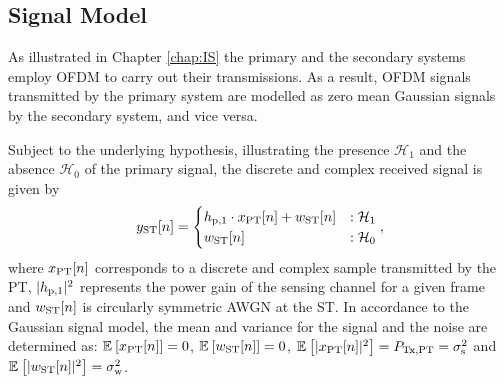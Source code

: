 

\subsection{Signal Model}
As illustrated in Chapter \ref{chap:IS} the primary and the secondary systems employ OFDM to carry out their transmissions. As a result, OFDM signals transmitted by the primary system are modelled as zero mean Gaussian signals by the secondary system, and vice versa. 

Subject to the underlying hypothesis, illustrating the presence $\mathcal H_1$ and the absence $\mathcal H_0$ of the primary signal, the discrete and complex received signal is given by 
\begin{equation}
y_{\text{ST}}[n] = 
\begin{cases}
h_{\text{p,1}} \cdot x_{\text{PT}}[n] + w_{\text{ST}}[n] & : \mathcal{H}_1 \\
w_{\text{ST}}[n] & :\mathcal{H}_0
\end{cases},
\label{eq_HS:sig_mod_st}
\end{equation}
where $x_{\text{PT}}[n]$ corresponds to a discrete and complex sample transmitted by the PT, $|h_{\text{p,1}}|^2$ represents the power gain of the sensing channel for a given frame and $w_{\text{ST}}[n]$ is circularly symmetric AWGN at the ST. 
In accordance to the Gaussian signal model, the mean and variance for the signal and the noise are determined as: ${\mathbb E}_{}\left[ x_{\text{PT}}[n] \right] = 0$, ${\mathbb E}_{}\left[ w_{\text{ST}}[n] \right] = 0$, ${\mathbb E}_{}\left[ |x_{\text{PT}}[n]|^2 \right] = P_{\text{Tx,PT}} = \sigma^2_{\text{s}}$ and ${\mathbb E}_{}\left[ |w_{\text{ST}}[n]|^2 \right] = \sigma^2_{\text{w}}$. 

